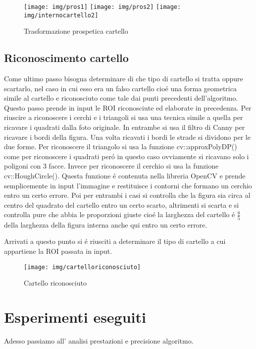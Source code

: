 	\begin{figure}[!ht]
		\centering
		\texttt{[image: img/pros1]}
		\texttt{[image: img/pros2]}
		\texttt{[image: img/internocartello2]}
		\caption{Trasformazione prospetica cartello}
	\end{figure}

\subsection{Riconoscimento cartello}

	Come ultimo passo bisogna determinare di che tipo di cartello si tratta oppure scartarlo, nel caso in cui esso era un falso cartello cio\'e una forma geometrica simile al cartello e riconosciuto come tale dai punti precedenti dell'algoritmo. Questo passo prende in input le ROI riconosciute ed elaborate in precedenza. Per riuscire a riconoscere i cerchi e i triangoli si usa una tecnica simile a quella per ricavare i quadrati dalla foto originale. In entrambe si usa il filtro di Canny per ricavare i bordi della figura. Una volta ricavati i bordi le strade si dividono per le due forme. Per riconoscere il triangolo si usa la funzione cv::approxPolyDP() come per riconoscere i quadrati per\'o in questo caso ovviamente si ricavano solo i poligoni con 3 facce. Invece per riconoscere il cerchio si usa la funzione cv::HoughCircle(). Questa funzione \'e contenuta nella libreria OpenCV e prende semplicemente in input l'immagine e restituisce i contorni che formano un cerchio entro un certo errore. Poi per entrambi i casi si controlla che la figura sia circa al centro del quadrato del cartello entro un certo scarto, altrimenti si scarta e si controlla pure che abbia le proporzioni giuste cio\'e la larghezza del cartello \'e $\frac{8}{5}$ della larghezza della figura interna anche qui entro un certo errore.

	Arrivati a questo punto si \'e riusciti a determinare il tipo di cartello a cui appartiene la ROI passata in input. 
	\begin{figure}[!ht]
		\centering
		\texttt{[image: img/cartelloriconosciuto]}
		\caption{Cartello riconosciuto}
	\end{figure}

\section{Esperimenti eseguiti}

	Adesso passiamo all' analisi prestazioni e precisione algoritmo.

